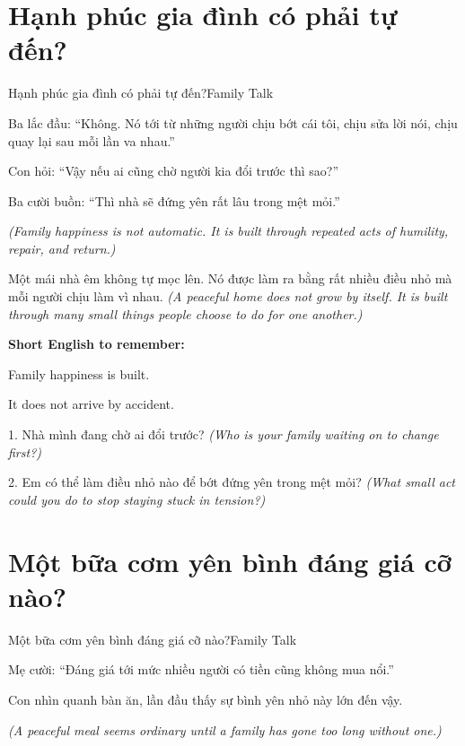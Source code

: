 \section{Hạnh phúc gia đình có phải tự đến?}
\begin{truyen}{Hạnh phúc gia đình có phải tự đến?}{Family Talk}

Ba lắc đầu: ``Không. Nó tới từ những người chịu bớt cái tôi, chịu sửa lời nói, chịu quay lại sau mỗi lần va nhau.''

Con hỏi: ``Vậy nếu ai cũng chờ người kia đổi trước thì sao?''

Ba cười buồn: ``Thì nhà sẽ đứng yên rất lâu trong mệt mỏi.''

\textit{(Family happiness is not automatic. It is built through repeated acts of humility, repair, and return.)}
\end{truyen}

\begin{baihoc}
Một mái nhà êm không tự mọc lên. Nó được làm ra bằng rất nhiều điều nhỏ mà mỗi người chịu làm vì nhau.
\textit{(A peaceful home does not grow by itself. It is built through many small things people choose to do for one another.)}
\end{baihoc}

\begin{ghinhoanh}
\textbf{Short English to remember:}

Family happiness is built.

It does not arrive by accident.
\end{ghinhoanh}

\begin{tuhocnhanh}
1. Nhà mình đang chờ ai đổi trước? \textit{(Who is your family waiting on to change first?)}

2. Em có thể làm điều nhỏ nào để bớt đứng yên trong mệt mỏi? \textit{(What small act could you do to stop staying stuck in tension?)}
\end{tuhocnhanh}
\ngancach

\section{Một bữa cơm yên bình đáng giá cỡ nào?}
\begin{truyen}{Một bữa cơm yên bình đáng giá cỡ nào?}{Family Talk}

Mẹ cười: ``Đáng giá tới mức nhiều người có tiền cũng không mua nổi.''

Con nhìn quanh bàn ăn, lần đầu thấy sự bình yên nhỏ này lớn đến vậy.

\textit{(A peaceful meal seems ordinary until a family has gone too long without one.)}
\end{truyen}

